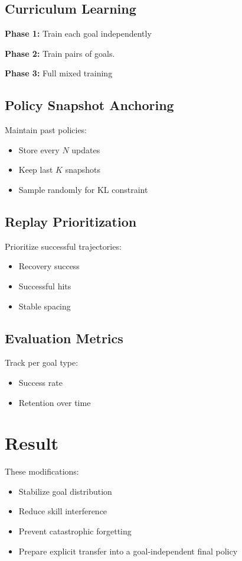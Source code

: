 \documentclass[11pt]{article}
\begin{document}
\subsection{Curriculum Learning}

\textbf{Phase 1:}
Train each goal independently

\textbf{Phase 2:}
Train pairs of goals.

\textbf{Phase 3:}
Full mixed training

\subsection{Policy Snapshot Anchoring}
Maintain past policies:
\begin{itemize}[noitemsep]
\item Store every $N$ updates
\item Keep last $K$ snapshots
\item Sample randomly for KL constraint
\end{itemize}

\subsection{Replay Prioritization}
Prioritize successful trajectories:
\begin{itemize}[noitemsep]
\item Recovery success
\item Successful hits
\item Stable spacing
\end{itemize}

\subsection{Evaluation Metrics}
Track per goal type:
\begin{itemize}[noitemsep]
\item Success rate
\item Retention over time
\end{itemize}

\section{Result}

These modifications:
\begin{itemize}[noitemsep]
\item Stabilize goal distribution
\item Reduce skill interference
\item Prevent catastrophic forgetting
\item Prepare explicit transfer into a goal-independent final policy
\end{itemize}
\end{document}
